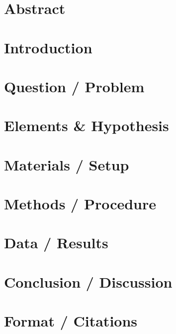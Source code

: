 \documentclass[letterpaper]{article}
\newcommand{\titleDOC}{}
\newcommand{\authorDOC}{Daniel Sabalakov}
\newcommand{\classDOC}{}
\begin{document}








\renewcommand{\authorDOC}{Daniel Sabalakov}

\renewcommand{\classDOC}{DE Intro to Biology I}

\renewcommand{\titleDOC}{Enzyme Lab Report}



\section{Abstract}\label{abstract}

\section{Introduction}\label{introduction}

\section{Question / Problem}\label{question-problem}

\section{Elements \& Hypothesis}\label{elements-hypothesis}

\section{Materials / Setup}\label{materials-setup}

\section{Methods / Procedure}\label{methods-procedure}

\section{Data / Results}\label{data-results}

\section{Conclusion / Discussion}\label{conclusion-discussion}

\section{Format / Citations}\label{format-citations}
\end{document}
